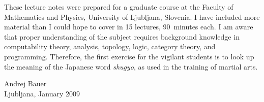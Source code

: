 \documentclass[11pt,a4paper,twoside]{book}
\newcommand{\clearemptydoublepage}{\newpage{\pagestyle{empty}\cleardoublepage}}
\begin{document}
These lecture notes were prepared for a graduate course at the Faculty
of Mathematics and Physics, University of Ljubljana, Slovenia. I have
included more material than I could hope to cover in 15 lectures,
90~minutes each. I am aware that proper understanding of the subject
requires background knowledge in computability theory, analysis,
topology, logic, category theory, and programming. Therefore, the
first exercise for the vigilant students is to look up the meaning of
the Japanese word \emph{shugyo}, as used in the training of martial
arts.


\bigskip

\begin{flushright}
Andrej Bauer\\
Ljubljana, January 2009
\end{flushright}



\clearemptydoublepage

{
\renewcommand{\markboth}[2]{}
\tableofcontents
}







\clearemptydoublepage



{
\renewcommand{\markboth}[2]{}

}




\end{document}
